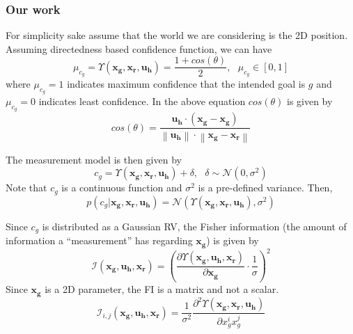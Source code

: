 \documentclass[]{article}
\newcommand{\norm}[1]{\left\lVert#1\right\rVert}
\begin{document}
\subsubsection*{Our work}
For simplicity sake assume that the world we are considering is the 2D position. Assuming directedness based confidence function, we can have 
\begin{equation*}
\mu_{c_g} = \Upsilon(\boldsymbol{x_g}, \boldsymbol{x_r}, \boldsymbol{u_h}) = \frac{1+cos(\theta)}{2}, ~~~ \mu_{c_g} \in [0,1]
\end{equation*}
where $\mu_{c_g}  = 1$ indicates maximum confidence that the intended goal is $g$ and $\mu_{c_g}  = 0$ indicates least confidence. In the above equation $cos(\theta)$ is given by 
\begin{equation*}
cos(\theta) = \frac{\boldsymbol{u_h}\cdot(\boldsymbol{x_g} - \boldsymbol{x_g})}{\norm{\boldsymbol{u_h}}\cdot\norm{\boldsymbol{x_g} - \boldsymbol{x_r}}}
\end{equation*}

The measurement model is then given by
\begin{equation*}
c_g = \Upsilon(\boldsymbol{x_g}, \boldsymbol{x_r}, \boldsymbol{u_h}) + \delta, ~~~ \delta \sim \mathcal{N}(0, \sigma^2) 
\end{equation*}
Note that $c_g$ is a continuous function and $\sigma^2$ is a pre-defined variance. 
Then,
\begin{equation*}
p(c_g|\boldsymbol{x_g}, \boldsymbol{x_r}, \boldsymbol{u_h}) = \mathcal{N}(\Upsilon(\boldsymbol{x_g}, \boldsymbol{x_r}, \boldsymbol{u_h}), \sigma^2)
\end{equation*}

Since $c_g$ is distributed as a Gaussian RV, the Fisher information (the amount of information a ``measurement'' has regarding $\boldsymbol{x_g}$) is given by
\begin{equation*}
	\mathcal{I}(\boldsymbol{x_g}, \boldsymbol{u_h}, \boldsymbol{x_r}) = \left(\frac{\partial\Upsilon(\boldsymbol{x_g}, \boldsymbol{u_h}, \boldsymbol{x_r})}{\partial \boldsymbol{x_g}}\cdot\frac{1}{\sigma}\right)^2
\end{equation*}
Since $\boldsymbol{x_g}$ is a 2D parameter, the FI is a matrix and not a scalar. 
\begin{equation*}
	\mathcal{I}_{i,j}(\boldsymbol{x_g}, \boldsymbol{u_h}, \boldsymbol{x_r}) = \frac{1}{\sigma^2}\frac{\partial^2\Upsilon(\boldsymbol{x_g}, \boldsymbol{x_r}, \boldsymbol{u_h})}{\partial x_g^ix_g^j}
\end{equation*}
\end{document}
